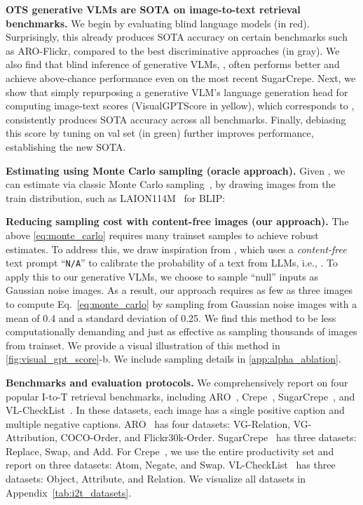 \documentclass{article} \usepackage{iclr2024_conference,times}
\begin{document}
\begin{table}[h]
    \caption{\small {\bf OTS generative VLMs are SOTA on image-to-text retrieval benchmarks.} We begin by evaluating \colorbox{softred}{blind language models (in red)}. Surprisingly, this already produces SOTA accuracy on certain benchmarks such as ARO-Flickr, compared to the \colorbox{softgray}{best discriminative approaches (in gray)}. We also find that blind inference of generative VLMs, \colorbox{softblue}{\vphantom{g}}, often performs better and achieve above-chance performance even on the most recent SugarCrepe. Next, we show that simply repurposing a generative VLM's language generation head for computing image-text scores \colorbox{softyellow}{(VisualGPTScore in yellow)}, which corresponds to , consistently produces SOTA accuracy across all benchmarks. Finally, debiasing this score by \colorbox{softgreen}{tuning  on val set (in green)} further improves performance, establishing the new SOTA.} 
\label{tab:i_to_t_retrieval}
\end{table}

{\bf Estimating  using Monte Carlo sampling (oracle approach).} Given , we can estimate  via classic Monte Carlo sampling~\citep{shapiro2003monte}, by drawing  images from the train distribution, such as LAION114M~\citep{laion400m} for BLIP:



{\bf Reducing sampling cost with content-free images (our approach).} The above \autoref{eq:monte_carlo} requires many trainset samples to achieve robust estimates. To address this, we draw inspiration from \citep{calibratellm}, which uses a {\em content-free} text prompt ``{\tt N/A}'' to calibrate the probability of a text from LLMs, i.e., . To apply this to our generative VLMs, we choose to sample ``null'' inputs as Gaussian noise images. As a result, our approach requires as few as three images to compute Eq.~\ref{eq:monte_carlo} by sampling from Gaussian noise images with a mean of 0.4 and a standard deviation of 0.25. We find this method to be less computationally demanding and just as effective as sampling thousands of images from trainset. We provide a visual illustration of this method in \autoref{fig:visual_gpt_score}-b. We include sampling details in \autoref{app:alpha_ablation}. 


{\bf Benchmarks and evaluation protocols.} We comprehensively report on four popular I-to-T retrieval benchmarks, including ARO~\citep{aro}, Crepe~\citep{crepe}, SugarCrepe~\cite{sugarcrepe}, and VL-CheckList~\citep{vlchecklist}. In these datasets, each image has a single positive caption and multiple negative captions. ARO~\citep{aro} has four datasets: VG-Relation, VG-Attribution, COCO-Order, and Flickr30k-Order. SugarCrepe~\citep{sugarcrepe} has three datasets: Replace, Swap, and Add. For Crepe~\citep{crepe}, we use the entire productivity set and report on three datasets: Atom, Negate, and Swap. VL-CheckList~\citep{vlchecklist} has three datasets: Object, Attribute, and Relation. We visualize all datasets in Appendix~\autoref{tab:i2t_datasets}.
\end{document}
